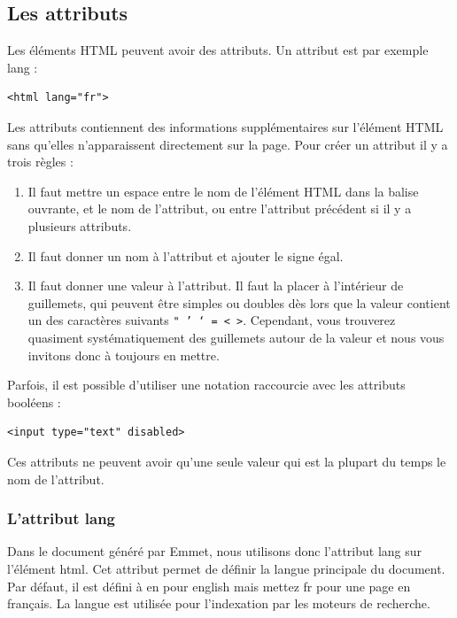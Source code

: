 \documentclass[a4paper]{article}
\begin{document}
\subsection{Les attributs}
Les éléments {\color{monOrange}HTML} peuvent avoir des attributs. Un attribut est par exemple {\color{monOrange}lang }:
\begin{verbatim}
<html lang="fr">
\end{verbatim}
Les attributs contiennent des informations supplémentaires sur l'élément {\color{monOrange}HTML}  sans qu'elles n'apparaissent directement sur la page. Pour créer un attribut il y a trois règles :
\begin{enumerate}
\item  Il faut mettre un espace entre le nom de l'élément {\color{monOrange}HTML}  dans la balise ouvrante, et le nom de l'attribut, ou entre l'attribut précédent si il y a plusieurs attributs.

\item  Il faut donner un nom à l'attribut et ajouter le signe égal.

\item   Il faut donner une valeur à l'attribut. Il faut la placer à l'intérieur de guillemets, qui peuvent être simples ou doubles dès lors que la valeur contient un des caractères suivants {\tt " ' ` = < >}. Cependant, vous trouverez quasiment systématiquement des guillemets autour de la valeur et nous vous invitons donc à toujours en mettre.
\end{enumerate}

Parfois, il est possible d'utiliser une notation raccourcie avec les attributs booléens :

\begin{verbatim}
<input type="text" disabled>
\end{verbatim}
Ces attributs ne peuvent avoir qu'une seule valeur qui est la plupart du temps le nom de l'attribut.

\subsubsection{L'attribut {\color{monOrange}lang}}
Dans le document généré par {\color{monOrange}Emmet}, nous utilisons donc l'attribut {\color{monOrange}lang} sur l'élément {\color{monOrange}html}. Cet attribut permet de définir la langue principale du document. Par défaut, il est défini à {\color{monOrange}en} pour {\color{monOrange}english} mais mettez {\color{monOrange}fr} pour une page en français. La langue est utilisée pour l'indexation par les moteurs de recherche.
\end{document}
